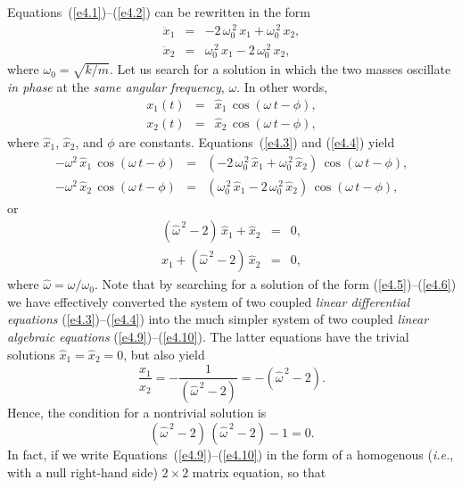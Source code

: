 Equations~(\ref{e4.1})--(\ref{e4.2}) can be rewritten in the form
\begin{eqnarray}\label{e4.3}
\ddot{x}_1 &=& -2\,\omega_0^{\,2}\,x_1+ \omega_0^{\,2}\,x_2,\\[0.5ex]
\ddot{x}_2&=& \omega_0^{\,2}\,x_1 - 2\,\omega_0^{\,2}\,x_2,\label{e4.4}
\end{eqnarray}
where $\omega_0=\sqrt{k/m}$. Let us search for a solution in which the two
masses oscillate {\em in phase}\/ at the {\em same angular frequency}, $\omega$. In other words,
\begin{eqnarray}\label{e4.5}
x_1(t) &=& \hat{x}_1\,\cos(\omega\,t-\phi),\\[0.5ex]
x_2(t) &=&\hat{x}_2\,\cos(\omega\,t-\phi),\label{e4.6}
\end{eqnarray}
where $\hat{x}_1$, $\hat{x}_2$, and $\phi$ are constants. Equations~(\ref{e4.3}) and
(\ref{e4.4}) yield
\begin{eqnarray}
-\omega^2\,\hat{x}_1\,\cos(\omega\,t-\phi) &=&\left( -2\,\omega_0^{\,2}\,\hat{x}_1+ \omega_0^{\,2}\,\hat{x}_2\right)\,\cos(\omega\,t-\phi),\\[0.5ex]
-\omega^2\,\hat{x}_2\,\cos(\omega\,t-\phi) &=&\left( \omega_0^{\,2}\,\hat{x}_1-2\,\omega_0^{\,2}\,\hat{x}_2\right)\,\cos(\omega\,t-\phi),
\end{eqnarray}
or
\begin{eqnarray}\label{e4.9}
(\hat{\omega}^{\,2}-2)\,\hat{x}_1 +\hat{x}_2 &=&0,\\[0.5ex]
\hat{x}_1 + (\hat{\omega}^{\,2}-2)\,\hat{x}_2&=&0,\label{e4.10}
\end{eqnarray}
where $\hat{\omega}=\omega/\omega_0$. Note that by searching for a solution
of the form (\ref{e4.5})--(\ref{e4.6}) we have effectively converted the system of two coupled
 {\em linear differential equations}\/ (\ref{e4.3})--(\ref{e4.4}) into the  much simpler system of two coupled  {\em linear algebraic
equations}\/ (\ref{e4.9})--(\ref{e4.10}). The latter equations have the trivial solutions $\hat{x}_1=\hat{x}_2=0$, but also yield
\begin{equation}\label{e4.11}
\frac{\hat{x}_1}{\hat{x}_2}=-\frac{1}{(\hat{\omega}^{\,2}-2)} =-( \hat{\omega}^{\,2}-2).
\end{equation}
Hence, the condition for a nontrivial solution is 
\begin{equation}\label{e4.12}
(\hat{\omega}^{\,2}-2)\,(\hat{\omega}^{\,2}-2)-1 = 0.
\end{equation}
In fact, if we write Equations~(\ref{e4.9})--(\ref{e4.10}) in the form of a homogenous ({\em i.e.}, with a null right-hand side) $2\times 2$ matrix equation, so that
